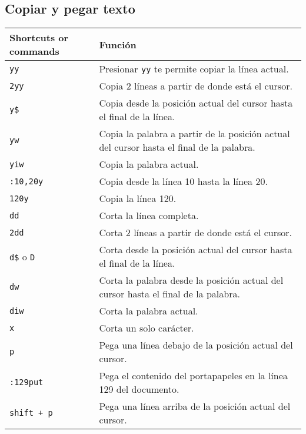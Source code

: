 \documentclass[
  doc,
  floatsintext,
  longtable,
  a4paper,
  nolmodern,
  notxfonts,
  notimes,
  colorlinks=true,linkcolor=blue,citecolor=blue,urlcolor=blue]{apa7}
\begin{document}
\subsection{Copiar y pegar texto}\label{copiar-y-pegar-texto}

\begin{longtable}[]{@{}
  >{\raggedright\arraybackslash}p{}
  >{\raggedright\arraybackslash}p{}@{}}
\toprule\noalign{}
\begin{minipage}[b]{\linewidth}\raggedright
Shortcuts or commands
\end{minipage} & \begin{minipage}[b]{\linewidth}\raggedright
Función
\end{minipage} \\
\midrule\noalign{}
\endhead
\bottomrule\noalign{}
\endlastfoot
\texttt{yy} & Presionar \texttt{yy} te permite copiar la línea
actual. \\
\texttt{2yy} & Copia 2 líneas a partir de donde está el cursor. \\
\texttt{y\$} & Copia desde la posición actual del cursor hasta el final
de la línea. \\
\texttt{yw} & Copia la palabra a partir de la posición actual del cursor
hasta el final de la palabra. \\
\texttt{yiw} & Copia la palabra actual. \\
\texttt{:10,20y} & Copia desde la línea 10 hasta la línea 20. \\
\texttt{120y} & Copia la línea 120. \\
\texttt{dd} & Corta la línea completa. \\
\texttt{2dd} & Corta 2 líneas a partir de donde está el cursor. \\
\texttt{d\$} o \texttt{D} & Corta desde la posición actual del cursor
hasta el final de la línea. \\
\texttt{dw} & Corta la palabra desde la posición actual del cursor hasta
el final de la palabra. \\
\texttt{diw} & Corta la palabra actual. \\
\texttt{x} & Corta un solo carácter. \\
\texttt{p} & Pega una línea debajo de la posición actual del cursor. \\
\texttt{:129put} & Pega el contenido del portapapeles en la línea 129
del documento. \\
\texttt{shift\ +\ p} & Pega una línea arriba de la posición actual del
cursor. \\
\end{longtable}
\end{document}
